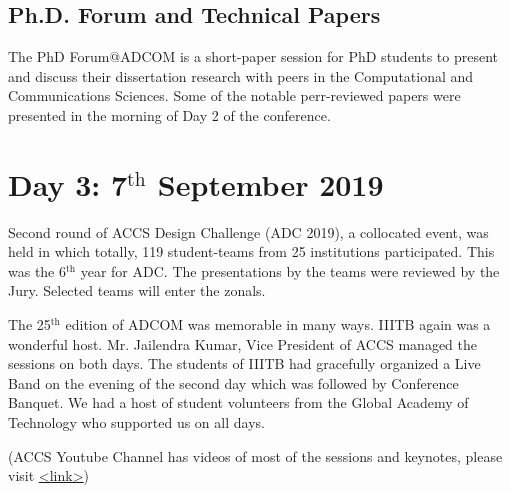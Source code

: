 \begin{multicols}{2}
\noindent
\subsection*{Ph.D. Forum and Technical Papers}

The PhD Forum@ADCOM is a short-paper session for PhD students to present and discuss their dissertation research with peers in the Computational and Communications Sciences. Some of the notable perr-reviewed papers were presented in the morning of Day 2 of the conference.


\section*{Day 3: 7$^{\text{th}}$ September 2019}

Second round of ACCS Design Challenge (ADC 2019), a collocated event, was held in which totally, 119 student-teams from 25 institutions participated. This was the 6$^{\text{th}}$ year for ADC. The presentations by the teams were reviewed by the Jury. Selected teams will enter the zonals.

The 25$^{\text{th}}$ edition of ADCOM was memorable in many ways. IIITB again was a wonderful host. Mr. Jailendra Kumar, Vice President of ACCS managed the sessions on both days. The students of IIITB had gracefully organized a Live Band on the evening of the second day which was followed by Conference Banquet. We had a host of student volunteers from the Global Academy of Technology who supported us on all days.

(ACCS Youtube Channel has videos of most of the sessions and keynotes, please visit \url{<link>})
\end{multicols}
